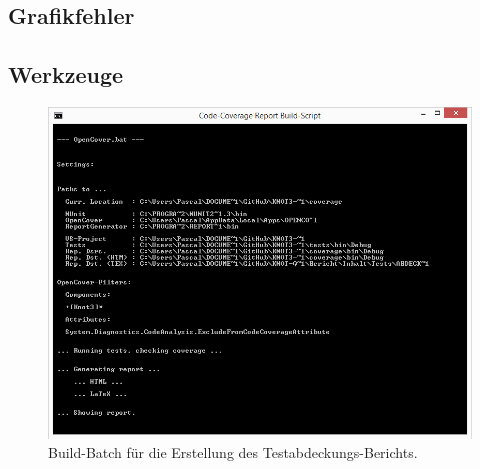 		~\\
	
	
\clearpage	

% 



\newpage




\subsection*{Grafikfehler}



\newpage



\subsection*{Werkzeuge}



\begin{figure}[ht]

	\centering
	
	\includegraphics[width=\textwidth]{Inhalt/Anhang/Grafiken/Werkzeuge/Code-Coverage Report Build-Script.png}
	
	\caption{Build-Batch für die Erstellung des Testabdeckungs-Berichts.}

\end{figure}








